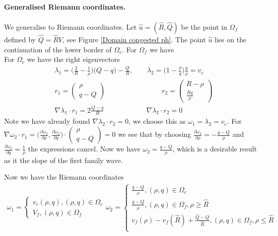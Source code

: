 \documentclass[10pt]{article}
\numberwithin{equation}{section}
\begin{document}
\paragraph{Generalised Riemann coordinates.}
We generalise to Riemann coordinates. Let $\hat u = (\hat R, \hat Q)$ be the point in $\Omega_f$ defined by $\hat Q = \hat R V$, see Figure \ref{Domain congested ph}. The point $\hat u$ lies on the continuation of the lower border of $\Omega_c$.  
For $\Omega_f$ we have \\
For $\Omega_c$ we have the right eigenvectors
\begin{align*}
    &\lambda_1 = \big ( \frac{2}{R} - \frac{1}{\rho} )\big (Q- q) - \frac{Q}{R}, \quad \quad \lambda_2 = \big(1 - \frac{\rho}{q}\big)\frac{q}{\rho} = v_c \\
    & r_1 = \begin{pmatrix} \rho \\ q - Q \end{pmatrix} \quad \quad \quad  \quad \quad \quad \quad \quad  r_2 = \begin{pmatrix} R - \rho \\ \frac{Rq}{\rho} \end{pmatrix} \\
    & \nabla \lambda_1 \cdot r_1 = 2\frac{Q-q}{R} \quad \quad \quad \quad \quad  \quad \nabla \lambda_2 \cdot r_2 = 0
\end{align*}
Note we have already found $\nabla \lambda_2 \cdot r_2 = 0$, we choose this as $\omega_1 = \lambda_2 = v_c$. For $\nabla \omega_2 \cdot r_1 = \big ( \frac{\partial \omega_2}{\partial \rho}, \frac{\partial \omega_2}{\partial q} \big ) \cdot \begin{pmatrix} \rho \\ q - Q \end{pmatrix} = 0 $ we see that by choosing  $\frac{\partial \omega_2}{\partial \rho} = - \frac{ q-Q }{\rho}$ and $ \frac{\partial \omega_2}{\partial q} =  \frac{1}{\rho} $ the expressions cancel. Now we have    $\omega_2 = \frac{q-Q}{\rho}$, which is a desirable result as it the slope of the first family wave. 

Now we have the Riemann coordinates
\begin{align*}
    \omega_1 = \begin{cases}
    v_c(\rho, q), (\rho, q) \in \Omega_c \\
    V_f, (\rho, q) \in \Omega_f
    \end{cases}
    \omega_2 = \begin{cases}
    \frac{q-Q}{\rho}, (\rho, q) \in \Omega_c \\
    \frac{q-Q}{\rho}, (\rho, q) \in \Omega_f, \rho \geq \hat R \\
    v_f(\rho) - v_f(\hat R) + \frac{\hat Q - Q}{\hat R }, (\rho, q) \in \Omega_f, \rho \leq \hat R \\
    \end{cases}
\end{align*}
\end{document}
